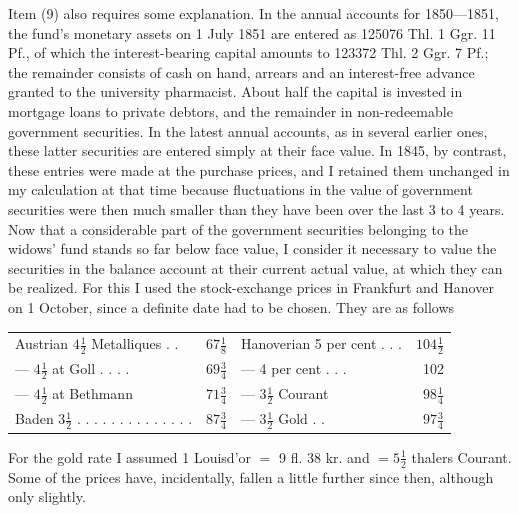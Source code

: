 Item (9) also requires some explanation. In the annual accounts for 1850—1851, the fund's monetary assets on 1 July 1851 are entered as 125076 Thl. 1 Ggr. 11 Pf., of which the interest-bearing capital amounts to 123372 Thl. 2 Ggr. 7 Pf.; the remainder consists of cash on hand, arrears and an interest-free advance granted to the university pharmacist. About half the capital is invested in mortgage loans to private debtors, and the remainder in non-redeemable government securities. In the latest annual accounts, as in several earlier ones, these latter securities are entered simply at their face value. In 1845, by contrast, these entries were made at the purchase prices, and I retained them unchanged in my calculation at that time because fluctuations in the value of government securities were then much smaller than they have been over the last 3 to 4 years. Now that a considerable part of the government securities belonging to the widows' fund stands so far below face value, I consider it necessary to value the securities in the balance account at their current actual value, at which they can be realized. For this I used the stock-exchange prices in Frankfurt and Hanover on 1 October, since a definite date had to be chosen. They are as follows
\begin{center}
\footnotesize\setlength{\tabcolsep}{2pt}
\begin{tabular}{l r|l r}
Austrian \(4\tfrac{1}{2}\) Metalliques . .&\(67\tfrac{1}{8}\)&Hanoverian 5 per cent . . .&\(104\tfrac{1}{2}\)\\
— \(4\tfrac{1}{2}\) at Goll . . . .&\(69\tfrac{3}{4}\)&— 4 per cent . . .&102\\
— \(4\tfrac{1}{2}\) at Bethmann&\(71\tfrac{3}{4}\)&— \(3\tfrac{1}{2}\) Courant&\(98\tfrac{1}{4}\)\\
Baden \(3\tfrac{1}{2}\) . . . . . . . . . . . . . .&\(87\tfrac{3}{4}\)&— \(3\tfrac{1}{2}\) Gold . .&\(97\tfrac{3}{4}\)
\end{tabular}
\end{center}
\noindent\hspace*{\parindent}For the gold rate I assumed 1 Louisd’or \(=\) 9 fl. 38 kr. and \(=5\tfrac{1}{2}\) thalers Courant. Some of the prices have, incidentally, fallen a little further since then, although only slightly.

